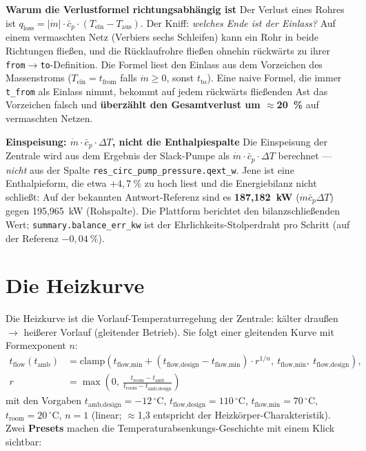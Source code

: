 \documentclass[11pt,a4paper,parskip=half]{scrreprt}
\newcommand{\gC}{\,\ensuremath{{}^{\circ}\mathrm{C}}}
\newenvironment{beispiel}[1][Beispiel]
  {\par\medskip{\color{bsp}\hrule height 0.8pt}\nopagebreak\smallskip
   \noindent\textbf{\textsf{\textcolor{bsp}{#1}}}\quad\ignorespaces}
  {\par\nopagebreak\smallskip{\color{bsp}\hrule height 0.8pt}\par\medskip}
\begin{document}
\begin{beispiel}[Warum die Verlustformel richtungsabhängig ist]
Der Verlust eines Rohres ist $q_\text{loss} = |\dot m| \cdot \bar c_p \cdot
(T_\text{ein} - T_\text{aus})$. Der Kniff: \emph{welches Ende ist der
Einlass?} Auf einem vermaschten Netz (Verbiers sechs Schleifen) kann ein Rohr
in beide Richtungen fließen, und die Rücklaufrohre fließen ohnehin
\glqq rückwärts\grqq{} zu ihrer \texttt{from}$\rightarrow$\texttt{to}-Definition.
Die Formel liest den Einlass aus dem Vorzeichen des Massenstroms
($T_\text{ein}=t_\text{from}$ falls $\dot m\geq0$, sonst $t_\text{to}$). Eine
naive Formel, die immer \texttt{t\_from} als Einlass nimmt, bekommt auf jedem
rückwärts fließenden Ast das Vorzeichen falsch und \textbf{überzählt den
Gesamtverlust um $\approx$20~\%} auf vermaschten Netzen.
\end{beispiel}

\begin{beispiel}[Einspeisung: $\dot m \cdot \bar c_p \cdot \Delta T$, nicht die Enthalpiespalte]
Die Einspeisung der Zentrale wird aus dem Ergebnis der Slack-Pumpe als
$\dot m \cdot \bar c_p \cdot \Delta T$ berechnet --- \emph{nicht} aus der Spalte
\texttt{res\_circ\_pump\_pressure.qext\_w}. Jene ist eine Enthalpieform, die
etwa $+4{,}7~\%$ zu hoch liest und die Energiebilanz nicht schließt: Auf der
bekannten Antwort-Referenz sind es \textbf{187{,}182~kW} ($\dot m\bar c_p\Delta T$)
gegen 195{,}965~kW (Rohspalte). Die Plattform berichtet den bilanzschließenden
Wert; \texttt{summary.balance\_err\_kw} ist der Ehrlichkeits-Stolperdraht pro
Schritt (auf der Referenz $-0{,}04~\%$).
\end{beispiel}

\section{Die Heizkurve}
\label{sec:heizkurve}

Die Heizkurve ist die Vorlauf-Temperaturregelung der Zentrale: kälter draußen
$\rightarrow$ heißerer Vorlauf (gleitender Betrieb). Sie folgt einer gleitenden
Kurve mit Formexponent $n$:
\begin{align*}
t_\text{flow}(t_\text{amb}) &= \text{clamp}\!\left(t_\text{flow,min} +
(t_\text{flow,design}-t_\text{flow,min})\cdot r^{1/n},\ t_\text{flow,min},\
t_\text{flow,design}\right), \\
r &= \max\!\left(0,\ \frac{t_\text{room}-t_\text{amb}}{t_\text{room}-t_\text{amb,design}}\right)
\end{align*}
mit den Vorgaben $t_\text{amb,design}=-12\gC$, $t_\text{flow,design}=110\gC$,
$t_\text{flow,min}=70\gC$, $t_\text{room}=20\gC$, $n=1$ (linear; $\approx$1{,}3
entspricht der Heizkörper-Charakteristik). Zwei \textbf{Presets} machen die
Temperaturabsenkungs-Geschichte mit einem Klick sichtbar:
\end{document}
